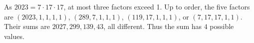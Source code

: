 As $2023=7\cdot17\cdot17$, at most three factors exceed 1. Up to order, the five factors are $(2023,1,1,1,1)$, $(289,7,1,1,1)$, $(119,17,1,1,1)$, or $(7,17,17,1,1)$. Their sums are $2027,299,139,43$, all different. Thus the sum has $\boxed4$ possible values.

